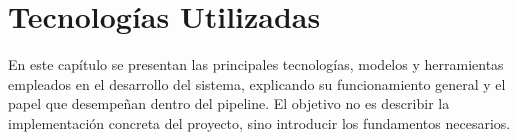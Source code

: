 \chapter{Tecnologías Utilizadas}
\label{cap:tecnologiasUtilizadas}

En este capítulo se presentan las principales tecnologías, modelos y herramientas empleados en el desarrollo del sistema, explicando su funcionamiento general y el papel que desempeñan dentro del pipeline. El objetivo no es describir la implementación concreta del proyecto, sino introducir los fundamentos necesarios.


% 





